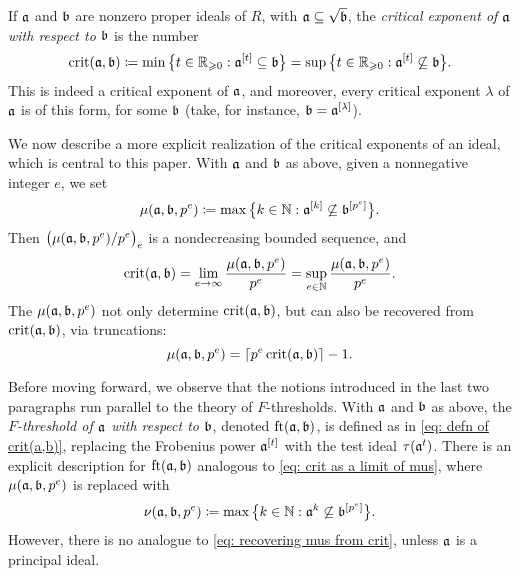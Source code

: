 \documentclass[11pt]{amsart}
\begin{document}
If $\mathfrak{a}$ and $\mathfrak{b}$ are nonzero proper ideals of $R$, with $\mathfrak{a} \subseteq \sqrt{\mathfrak{b}}$, the \emph{critical exponent of $\mathfrak{a}$ with respect to $\mathfrak{b}$} is the number
\begin{equation}\label{eq: defn of crit(a,b)}
   \operatorname{crit}(\mathfrak{a},\mathfrak{b}) \coloneqq \min\big\{t\in \mathbb{R}_{\geqslant 0}: \mathfrak{a}^{[t]} \subseteq \mathfrak{b}\big\}
      = \sup\big\{t\in \mathbb{R}_{\geqslant 0}: \mathfrak{a}^{[t]} \not\subseteq \mathfrak{b}\big\}.
\end{equation}
This is indeed a critical exponent of $\mathfrak{a}$, and moreover, every critical exponent $\lambda$ of $\mathfrak{a}$ is of this form, for some $\mathfrak{b}$ (take, for instance, $\mathfrak{b} = \mathfrak{a}^{[\lambda]}$).

We now describe a more explicit realization of the critical exponents of an ideal, which is central to this paper.
With $\mathfrak{a}$ and $\mathfrak{b}$ as above, given a nonnegative integer $e$, we set
\[\mu(\mathfrak{a},\mathfrak{b},p^e) \coloneqq \max\big\{k\in \mathbb{N} : \mathfrak{a}^{[k]} \not\subseteq \mathfrak{b}^{[p^e]}\big\}.\]
Then $\big(\mu(\mathfrak{a},\mathfrak{b},p^e)/p^e\big)_e$ is a nondecreasing bounded sequence, and
\begin{equation}\label{eq: crit as a limit of mus}
   \operatorname{crit}(\mathfrak{a},\mathfrak{b}) = \lim_{e\to \infty} \frac{\mu(\mathfrak{a},\mathfrak{b},p^e)}{p^e} = \sup_{e\in \mathbb{N}} \frac{\mu(\mathfrak{a},\mathfrak{b},p^e)}{p^e}.
\end{equation}
The $\mu(\mathfrak{a},\mathfrak{b},p^e)$ not only determine $\operatorname{crit}(\mathfrak{a},\mathfrak{b})$, but can also be recovered from $\operatorname{crit}(\mathfrak{a},\mathfrak{b})$, via truncations:
\begin{equation}\label{eq: recovering mus from crit}
   \mu(\mathfrak{a},\mathfrak{b},p^e) = \left\lceil p^e\operatorname{crit}(\mathfrak{a},\mathfrak{b}) \right\rceil - 1.
\end{equation}

Before moving forward, we observe that the notions introduced in the last two paragraphs run parallel to the theory of $F$-thresholds.
With $\mathfrak{a}$ and $\mathfrak{b}$ as above, the \emph{$F$-threshold of $\mathfrak{a}$ with respect to $\mathfrak{b}$}, denoted $\operatorname{ft}(\mathfrak{a}, \mathfrak{b})$, is defined as in \eqref{eq: defn of crit(a,b)}, replacing the Frobenius power $\mathfrak{a}^{[t]}$ with the test ideal $\tau(\mathfrak{a}^t)$.
There is an explicit description for $\operatorname{ft}(\mathfrak{a}, \mathfrak{b})$ analogous to \eqref{eq: crit as a limit of mus}, where $\mu(\mathfrak{a},\mathfrak{b},p^e)$ is replaced with
\[\nu(\mathfrak{a},\mathfrak{b},p^e) \coloneqq \max\big\{k\in \mathbb{N} : \mathfrak{a}^{k} \not\subseteq \mathfrak{b}^{[p^e]}\big\}.\]
However, there is no analogue to \eqref{eq: recovering mus from crit}, unless $\mathfrak{a}$ is a principal ideal.
\end{document}
